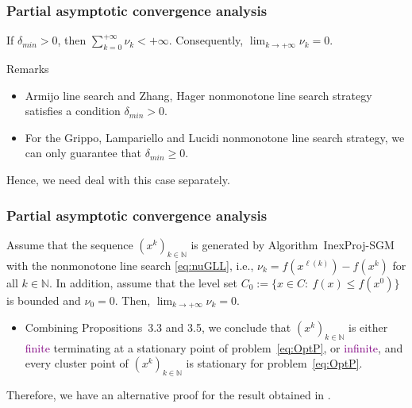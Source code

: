\begin{frame}[t]\frametitle{Partial asymptotic convergence analysis}
  \begin{corollary}[3.4]
    If $\delta_{min}>0$,  then  $\displaystyle\sum_{k=0}^{+\infty} \nu_k<+\infty$. Consequently, $\displaystyle\lim_{k\to +\infty} \nu_{k} = 0$.
  \end{corollary}

  \bigskip
  \bigskip

  \begin{block}{Remarks}
\begin{itemize}
  \item    Armijo line search and Zhang, Hager nonmonotone line search strategy satisfies  a condition $\delta_{min}>0$.
  \item For the Grippo, Lampariello and Lucidi nonmonotone line search strategy,  we   can only guarantee that $\delta_{min}\geq 0$.
\end{itemize}

 Hence,  we need deal with this case separately.
  \end{block}
\end{frame}



\begin{frame}\frametitle{Partial asymptotic convergence analysis}
  \begin{proposition}[3.5]
    Assume that the sequence  $(x^k)_{k\in\mathbb{N}}$ is generated by Algorithm~InexProj-SGM with the  nonmonotone line  search \eqref{eq:nuGLL}, i.e.,  $\nu_{k}= f(x^{\ell(k)})-f(x^k)$ for all  $k \in \mathbb{N}$. In addition,  assume that the level set $C_{0}:=\{ x\in C: ~ f(x)\leq f(x^0) \}$ is bounded and $\nu_0= 0$.  Then, $\displaystyle\lim_{k\to +\infty} \nu_{k} = 0$.
  \end{proposition}

    \bigskip
  \bigskip

  \begin{remark}\normalfont

  \begin{itemize}
    \item Combining Propositions~3.3 and 3.5, we conclude that  $(x^k)_{k\in\mathbb{N}}$  is either \textcolor{purple}{finite} terminating at a stationary point of problem~\eqref{eq:OptP}, or \textcolor{purple}{infinite},  and every cluster point of $(x^k)_{k\in\mathbb{N}}$ is stationary for problem~\eqref{eq:OptP}.  
  \end{itemize}

    Therefore, we have an alternative proof for the result obtained in \cite[Theorem 2.1]{BirginMartinezRaydan2003}.
  \end{remark}
\end{frame}


